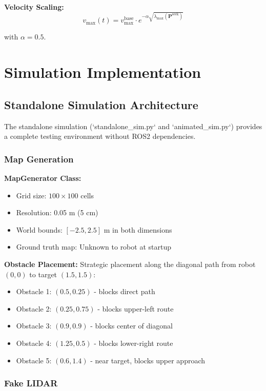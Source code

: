 \documentclass[11pt]{article}
\begin{document}
\textbf{Velocity Scaling:}
\[
v_{\max}(t) = v_{\max}^{\text{base}} \cdot e^{-\alpha \sqrt{\lambda_{\max}(\mathbf{P}^{\text{seek}})}}
\]

with $\alpha = 0.5$.

\section{Simulation Implementation}

\subsection{Standalone Simulation Architecture}

The standalone simulation (`standalone_sim.py` and `animated_sim.py`) provides a complete testing environment without ROS2 dependencies.

\subsubsection{Map Generation}

\textbf{MapGenerator Class:}
\begin{itemize}
    \item Grid size: $100 \times 100$ cells
    \item Resolution: 0.05 m (5 cm)
    \item World bounds: $[-2.5, 2.5]$ m in both dimensions
    \item Ground truth map: Unknown to robot at startup
\end{itemize}

\textbf{Obstacle Placement:}
Strategic placement along the diagonal path from robot $(0, 0)$ to target $(1.5, 1.5)$:
\begin{itemize}
    \item Obstacle 1: $(0.5, 0.25)$ - blocks direct path
    \item Obstacle 2: $(0.25, 0.75)$ - blocks upper-left route
    \item Obstacle 3: $(0.9, 0.9)$ - blocks center of diagonal
    \item Obstacle 4: $(1.25, 0.5)$ - blocks lower-right route
    \item Obstacle 5: $(0.6, 1.4)$ - near target, blocks upper approach
\end{itemize}

\subsubsection{Fake LIDAR}
\end{document}
